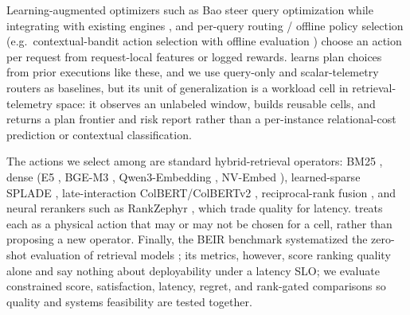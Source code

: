 \begin{table}[t]
\centering
\caption{Design space of certified plan selection under shift. Existing certified-plan work bounds per-query latency for relational SQL; \CWC{} occupies the workload-window violation-rate cell for hybrid retrieval.}
\label{tab:certtax}
\footnotesize
{}
\end{table}

Learning-augmented optimizers such as Bao steer query optimization while integrating with existing engines \cite{marcus2021bao}, and per-query routing / offline policy selection (e.g.\ contextual-bandit action selection with offline evaluation \cite{li2010contextualbandit}) choose an action per request from request-local features or logged rewards. \WCR{} learns plan choices from prior executions like these, and we use query-only and scalar-telemetry routers as baselines, but its unit of generalization is a workload cell in retrieval-telemetry space: it observes an unlabeled window, builds reusable cells, and returns a plan frontier and risk report rather than a per-instance relational-cost prediction or contextual classification.

The actions we select among are standard hybrid-retrieval operators: BM25 \cite{robertson2009bm25}, dense (E5 \cite{wang2022e5}, BGE-M3 \cite{chen2024m3embedding}, Qwen3-Embedding \cite{zhang2025qwen3embedding}, NV-Embed \cite{lee2024nvembed}), learned-sparse SPLADE \cite{formal2021splade}, late-interaction ColBERT/ColBERTv2 \cite{khattab2020colbert,santhanam2021colbertv2}, reciprocal-rank fusion \cite{cormack2009rrf}, and neural rerankers such as RankZephyr \cite{pradeep2023rankzephyr}, which trade quality for latency. \WCR{} treats each as a physical action that may or may not be chosen for a cell, rather than proposing a new operator. Finally, the BEIR benchmark systematized the zero-shot evaluation of retrieval models \cite{thakur2021beir}; its metrics, however, score ranking quality alone and say nothing about deployability under a latency SLO; we evaluate constrained score, satisfaction, latency, regret, and rank-gated comparisons so quality and systems feasibility are tested together.
